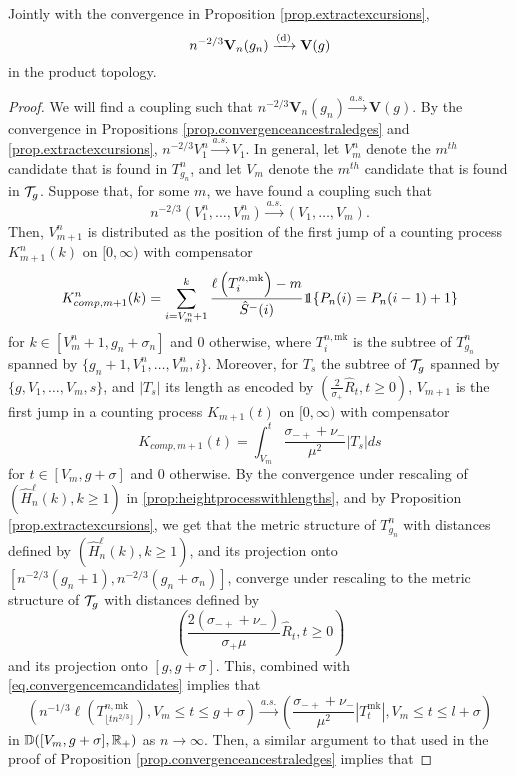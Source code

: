 \begin{proposition}\label{prop.convergencestartingpointscandidates}
Jointly with the convergence in Proposition \ref{prop.extractexcursions}, 
$$n^{-2/3}\mathbf{V}_n(g_n)\xrightarrow[]{\mathrm{(d)}}\mathbf{V}(g)$$
in the product topology.
\end{proposition}
\begin{proof}
We will find a coupling such that $n^{-2/3}\mathbf{V}_n(g_n)\overset{a.s.}{\to}\mathbf{V}(g).$ By the convergence in Propositions \ref{prop.convergenceancestraledges} and \ref{prop.extractexcursions}, $n^{-2/3}V_1^n\overset{a.s.}{\to}V_1$. In general, let $V_m^n$ denote the $m^{th}$ candidate that is found in $T^n_{g_n}$, and let $V_m$ denote the $m^{th}$ candidate that is found in ${\mathcal T}_g$. Suppose that, for some $m$, we have found a coupling such that 
\begin{equation}\label{eq.convergencemcandidates}n^{-2/3}(V_1^n,\dots,V_m^n)\overset{a.s.}{\to}(V_1,\dots,V_m).\end{equation}
Then, $V_{m+1}^n$ is distributed as the position of the first jump of a counting process $K^n_{m+1}(k)$ on $[0,\infty)$ with compensator 
$$K^n_{comp,m+1}(k)=\sum_{i=V_m^n+1}^k \frac{\ell\left(T^{n,\text{mk}}_{i}\right)-m}{\hat{S}^-(i)}  \one{\left\{P_n(i)=P_n(i-1)+1\right\}}$$
for $k\in [V_m^n+1,g_n+\sigma_n]$ and $0$ otherwise, where $T^{n,\text{mk}}_{i}$ is the subtree of $T^n_{g_n}$ spanned by $\{g_n+1,V^n_1,\dots,V^n_m,i\}$. 
Moreover, for $T_s$ the subtree of ${\mathcal T}_g$ spanned by $\{g,V_1,\dots,V_m, s\}$, and $|T_s|$ its length as encoded by $\left(\frac{2}{\sigma_+}\hat{R}_t,t\geq 0\right)$, $V_{m+1}$ is the first jump in a counting process $K_{m+1}(t)$ on $[0,\infty)$ with compensator 
$$K_{comp,m+1}(t)= \int_{V_m}^t\frac{\sigma_{-+}+\nu_-}{\mu^2}|T_s|ds$$
for $t\in [V_m,g+\sigma]$ and $0$ otherwise. By the convergence under rescaling of $(\hat{H}^\ell_n(k),k\geq 1)$ in \cref{prop:heightprocesswithlengths}, and by Proposition \ref{prop.extractexcursions}, we get that the metric structure of $T^n_{g_n}$ with distances defined by $(\hat{H}^\ell_n(k),k\geq 1)$, and its projection onto $[n^{-2/3}(g_n+1),n^{-2/3}(g_n+\sigma_n)]$, converge under rescaling to the metric structure of ${\mathcal T}_g$ with distances defined by $$\left(\frac{2(\sigma_{-+}+\nu_-)}{\sigma_+\mu}\hat{R}_t,t\geq 0\right)$$ and its projection onto $[g,g+\sigma]$. This, combined with \eqref{eq.convergencemcandidates} implies that 
$$\left(n^{-1/3}\ell\left(T^{n,\text{mk}}_{\lfloor t n^{2/3}\rfloor}\right),V_m\leq t \leq g+\sigma\right)\overset{a.s.}{\to} \left(\frac{\sigma_{-+}+\nu_-}{\mu^2}|T^{\text{mk}}_t|, V_m\leq t \leq l+\sigma\right)$$ in ${\mathbb D}([V_m,g+\sigma],{\mathbb R}_+)$ as $n\to \infty$. Then, a similar argument to that used in the proof of Proposition \ref{prop.convergenceancestraledges} implies that 

\end{proof}

